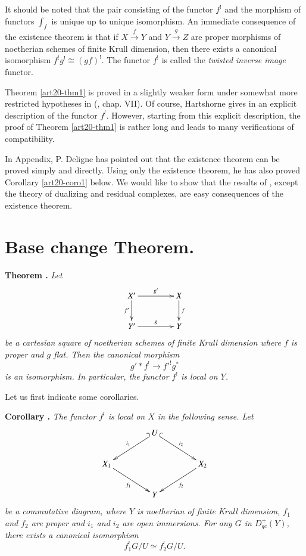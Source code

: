 It should be noted that the pair consisting of the functor $f^{!}$ and the morphism of functors $\int_{f}$ is unique up to unique isomorphism. An immediate consequence of the existence theorem is that if $X\xrightarrow{f}Y$ and $Y\xrightarrow{g}Z$ are proper morphisms of noetherian schemes of finite Krull dimension, then there exists a canonical isomorphism $f^{!}g^{!}\cong (gf)^{!}$. The functor $f^{!}$ is called the {\em twisted inverse image} functor.

Theorem \ref{art20-thm1} is proved in a slightly weaker form under somewhat more restricted hypotheses in (\cite{art20-key1}, chap. VII). Of course, Hartshorne gives in \cite{art20-key1} an explicit description of the functor $f^{!}$. However, starting from this explicit description, the proof of Theorem \ref{art20-thm1} is rather long and leads to many verifications of compatibility.

In \cite{art20-key1} Appendix, P. Deligne has pointed out that the existence theorem can be proved simply and directly. Using only the existence theorem, he has also proved Corollary \ref{art20-coro1} below. We would like to show that the results of \cite{art20-key1}, except the theory of dualizing and residual complexes, are easy consequences of the existence theorem.

\section{Base change Theorem.}\label{art20-sec2}

\noindent
{\bf Theorem .\label{ART20-THM2}}
{\em Let}
\[
\xymatrix@C=1.5cm{
X'\ar[d]_-{f'}\ar[r]^-{g'} & X\ar[d]^-{f}\\
Y'\ar[r]^-{g} & Y
}
\]
{\em be a cartesian square of noetherian schemes of finite Krull dimension where $f$ is proper and $g$ flat. Then the canonical morphism}
\begin{equation}
g'\ast f^{!}\to {f'}^{!}g^{*}\label{art20-2.1}
\end{equation}\pageoriginale
{\em is an isomorphism. In particular, the functor $f^{!}$ is local on $Y$.}
\smallskip

Let us first indicate some corollaries.

\medskip
\noindent
{\bf Corollary .\label{art20-coro1}}
{\em The functor $f^{!}$ is local on $X$ in the following sense. Let}
\[
\xymatrix@C=1.5cm{
 & U\ar@{_(->}[dl]_-{i_{1}}\ar@{^(->}[dr]^-{i_{2}} & \\
X_{1}\ar[dr]_-{f_{1}} & & X_{2}\ar[dl]^-{f_{2}}\\
 & Y & 
}
\]
{\em be a commutative diagram, where $Y$ is noetherian of finite Krull dimension, $f_{1}$ and $f_{2}$ are proper and $i_{1}$ and $i_{2}$ are open immersions. For any $G$ in $D^{+}_{qc}(Y)$, there exists a canonical isomorphism}
$$
f^{!}_{1}G/U\simeq f^{!}_{2}G/U.
$$

